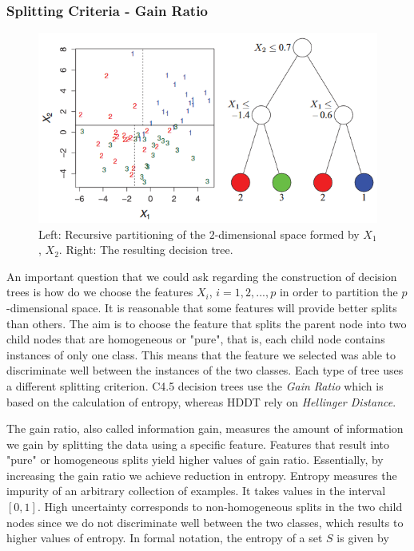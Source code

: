 \documentclass{acm_proc_article-sp}
\begin{document}
\subsubsection{Splitting Criteria - Gain Ratio}

\begin{figure}
	\centering
	\includegraphics[scale=.52]{Partitioning}
	\caption{Left: Recursive partitioning of the $2$-dimensional space formed by $X_1$, $X_2$. Right: The resulting decision tree.}
	\label{Fig1}
\end{figure}	

An important question that we could ask regarding the construction of decision trees is how do we choose the features $X_i$, $i = 1,2,...,p$ in order to partition the $p$-dimensional space. It is reasonable that some features will provide better splits than others. The aim is to choose the feature that splits the parent node into two child nodes that are homogeneous or "pure", that is, each child node contains instances of only one class. This means that the feature we selected was able to discriminate well between the instances of the two classes. Each type of tree uses a different splitting criterion. C4.5 decision trees use the \textit{Gain Ratio} which is based on the calculation of entropy, whereas HDDT rely on \textit{Hellinger Distance}.

The gain ratio, also called information gain, measures the amount of information we gain by splitting the data using a specific feature. Features that result into "pure" or homogeneous splits yield higher values of gain ratio. Essentially, by increasing the gain ratio we achieve reduction in entropy. Entropy measures the impurity of an arbitrary collection of examples. It takes values in the interval $[0,1]$. High uncertainty corresponds to non-homogeneous splits in the two child nodes since we do not discriminate well between the two classes, which results to higher values of entropy. In formal notation, the entropy of a set $S$ is given by
\end{document}
